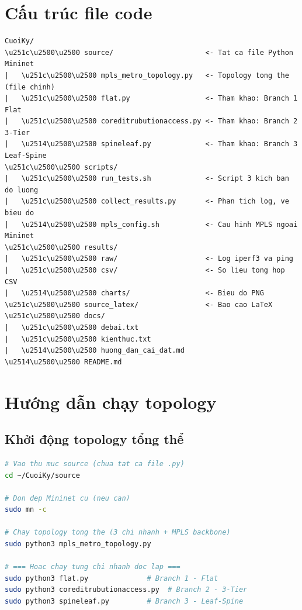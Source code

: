 \section{Cấu trúc file code}

\begin{verbatim}
CuoiKy/
\u251c\u2500\u2500 source/                      <- Tat ca file Python Mininet
|   \u251c\u2500\u2500 mpls_metro_topology.py   <- Topology tong the (file chinh)
|   \u251c\u2500\u2500 flat.py                  <- Tham khao: Branch 1 Flat
|   \u251c\u2500\u2500 coreditrubutionaccess.py <- Tham khao: Branch 2 3-Tier
|   \u2514\u2500\u2500 spineleaf.py             <- Tham khao: Branch 3 Leaf-Spine
\u251c\u2500\u2500 scripts/
|   \u251c\u2500\u2500 run_tests.sh             <- Script 3 kich ban do luong
|   \u251c\u2500\u2500 collect_results.py       <- Phan tich log, ve bieu do
|   \u2514\u2500\u2500 mpls_config.sh           <- Cau hinh MPLS ngoai Mininet
\u251c\u2500\u2500 results/
|   \u251c\u2500\u2500 raw/                     <- Log iperf3 va ping
|   \u251c\u2500\u2500 csv/                     <- So lieu tong hop CSV
|   \u2514\u2500\u2500 charts/                  <- Bieu do PNG
\u251c\u2500\u2500 source_latex/                <- Bao cao LaTeX
\u251c\u2500\u2500 docs/
|   \u251c\u2500\u2500 debai.txt
|   \u251c\u2500\u2500 kienthuc.txt
|   \u2514\u2500\u2500 huong_dan_cai_dat.md
\u2514\u2500\u2500 README.md
\end{verbatim}

\section{Hướng dẫn chạy topology}

\subsection{Khởi động topology tổng thể}

\begin{lstlisting}[language=bash, frame=single, basicstyle=\ttfamily\small]
# Vao thu muc source (chua tat ca file .py)
cd ~/CuoiKy/source

# Don dep Mininet cu (neu can)
sudo mn -c

# Chay topology tong the (3 chi nhanh + MPLS backbone)
sudo python3 mpls_metro_topology.py

# === Hoac chay tung chi nhanh doc lap ===
sudo python3 flat.py              # Branch 1 - Flat
sudo python3 coreditrubutionaccess.py  # Branch 2 - 3-Tier
sudo python3 spineleaf.py         # Branch 3 - Leaf-Spine
\end{lstlisting}

